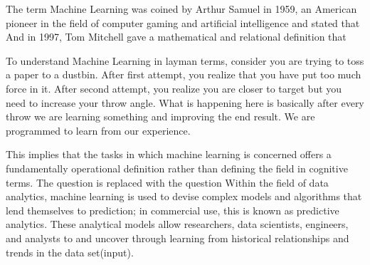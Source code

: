 \begin{enumerate}
    The term Machine Learning was coined by Arthur Samuel in 1959, an American pioneer in the field of computer gaming and artificial intelligence and stated that 
And in 1997, Tom Mitchell gave a  mathematical and relational definition that 

    To understand Machine Learning in layman terms, consider you are trying to toss a paper to a dustbin. After first attempt, you realize that you have put too much force in it. After second attempt, you realize you are closer to target but you need to increase your throw angle. What is happening here is basically after every throw we are learning something and improving the end result. We are programmed to learn from our experience.

This implies that the tasks in which machine learning is concerned offers a fundamentally operational definition rather than defining the field in cognitive terms. The question  is replaced with the question 
Within the field of data analytics, machine learning is used to devise complex models and algorithms that lend themselves to prediction; in commercial use, this is known as predictive analytics. These analytical models allow researchers, data scientists, engineers, and analysts to  and uncover  through learning from historical relationships and trends in the data set(input).

\end{enumerate}